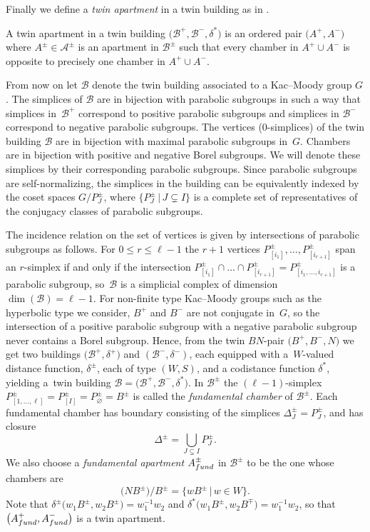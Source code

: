 \documentclass[11pt]{article}
\numberwithin{equation}{section}
\numberwithin{equation}{section}
\def\cA{\mathcal A}
\def\cB{\mathcal B}
\begin{document}
Finally we define a {\it twin apartment} in a twin building as in \cite[Definition~5.171]{AbramenkoBrown08}.
\begin{Definition}\label{definition:Twin_Apartment}
A twin apartment in a twin building $\big(\cB^+, \cB^-, \delta^*\big)$ is an ordered pair $\big(A^+, A^-\big)$ where $A^\pm\in \cA^\pm$ is an apartment in $\cB^\pm$ such that every chamber in $A^+\cup A^-$ is opposite to precisely one chamber in $A^+\cup A^-$.
\end{Definition}

From now on let $\cB$ denote the twin building associated to a Kac--Moody group $G$.
The simplices of $\cB$ are in bijection with parabolic subgroups in such a way that simplices in~$\cB^+$ correspond to positive parabolic subgroups and simplices in $\cB^-$ correspond to negative parabolic subgroups. The vertices ($0$-simplices) of the twin building $\cB$ are in bijection with maximal parabolic subgroups in~$G$. Chambers are in bijection with positive and negative Borel subgroups.
 We will denote these simplices by their corresponding parabolic subgroups.
Since parabolic subgroups are self-normalizing, the simplices in the building can be equivalently indexed by the coset spaces $G/P_J^\pm$, where $\big\{P_{J}^\pm\, |\, J\subsetneq I\big\}$ is a complete set of representatives of the conjugacy classes of parabolic subgroups.

The incidence relation on the set of vertices is given by intersections of parabolic subgroups as follows. For $0\leq r\leq \ell-1$ the $r+1$ vertices $P_{[i_1]}^\pm,\dots , P_{[i_{r+1}]}^\pm$ span an $r$-simplex if and only if the intersection
$P_{[i_1]}^\pm\cap \dots \cap P_{[i_{r+1}]}^\pm = P_{[i_{1},\dots, i_{r+1}]}^\pm$ is a parabolic subgroup, so~$\cB$ is a simplicial complex of dimension $ \dim(\cB) =\ell -1$.
For non-finite type Kac--Moody groups such as the hyperbolic type we consider, $B^+$ and $B^-$ are not conjugate in~$G$, so the intersection of a positive parabolic subgroup with a negative parabolic subgroup never contains a Borel subgroup.
Hence, from the twin $BN$-pair $\big(B^+,B^-,N\big)$ we get two buildings $\big(\cB^+,\delta^+\big)$ and $(\cB^-,\delta^-)$, each equipped with a~$W$-valued distance function, $\delta^\pm$,
each of type $(W,S)$, and a codistance function $\delta^*$, yielding a~twin building $\cB=\big(\cB^+, \cB^-, \delta^*\big)$. In $\cB^\pm$ the $(\ell-1)$-simplex $P_{[1,\dots, {\ell}]}^\pm = P_{[I]}^\pm = P_\varnothing^\pm = B^\pm$ is called the {\em fundamental chamber} of $\cB^\pm$. Each fundamental chamber has boundary consisting of the simplices $\Delta_J^\pm = P_J^\pm$, and has closure
\[\Delta^\pm = \bigcup_{J\subsetneq I} P_J^\pm.\]
We also choose a {\it fundamental apartment} $A^\pm_{\rm fund}$ in $\cB^\pm$ to be the one whose chambers are
\[\big(NB^\pm\big)/B^\pm = \big\{wB^\pm\,|\, w\in W\big\}.\]
Note that $\delta^\pm\big(w_1B^\pm,w_2B^\pm\big) = w_1^{-1} w_2$ and $\delta^*\big(w_1B^\pm,w_2B^\mp\big) = w_1^{-1} w_2$, so that $\big(A^+_{\rm fund},A^-_{\rm fund}\big)$ is a twin apartment.
\end{document}
